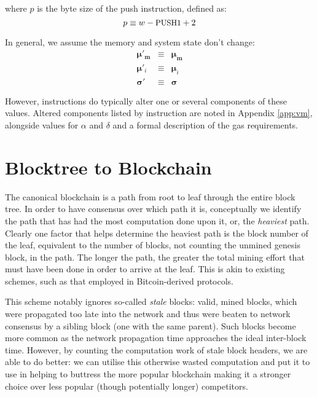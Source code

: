 \documentclass[9pt,oneside]{amsart}
\begin{document}
\begin{multicols}{2}
where $p$ is the byte size of the push instruction, defined as:
\begin{equation}
p \equiv w - \text{\small PUSH1} + 2
\end{equation}

In general, we assume the memory and system state don't change:
\begin{eqnarray}
\boldsymbol{\mu}'_\mathbf{m} & \equiv & \boldsymbol{\mu}_\mathbf{m} \\
\boldsymbol{\mu}'_i & \equiv & \boldsymbol{\mu}_i \\
\boldsymbol{\sigma}' & \equiv & \boldsymbol{\sigma}
\end{eqnarray}

However, instructions do typically alter one or several components of these values. Altered components listed by instruction are noted in Appendix \ref{app:vm}, alongside values for $\alpha$ and $\delta$ and a formal description of the gas requirements.

\section{Blocktree to Blockchain} \label{ch:ghost}

The canonical blockchain is a path from root to leaf through the entire block tree. In order to have consensus over which path it is, conceptually we identify the path that has had the most computation done upon it, or, the \textit{heaviest} path. Clearly one factor that helps determine the heaviest path is the block number of the leaf, equivalent to the number of blocks, not counting the unmined genesis block, in the path. The longer the path, the greater the total mining effort that must have been done in order to arrive at the leaf. This is akin to existing schemes, such as that employed in Bitcoin-derived protocols.

This scheme notably ignores so-called \textit{stale} blocks: valid, mined blocks, which were propagated too late into the network and thus were beaten to network consensus by a sibling block (one with the same parent). Such blocks become more common as the network propagation time approaches the ideal inter-block time. However, by counting the computation work of stale block headers, we are able to do better: we can utilise this otherwise wasted computation and put it to use in helping to buttress the more popular blockchain making it a stronger choice over less popular (though potentially longer) competitors.


\end{multicols}
\end{document}
